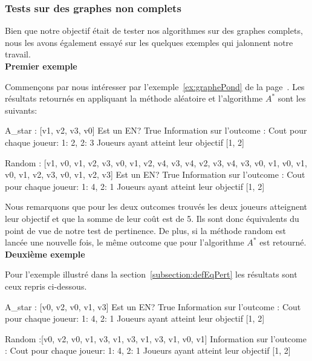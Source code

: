 \FloatBarrier

\subsubsection*{Tests sur des graphes non complets}

Bien que notre objectif était de tester nos algorithmes sur des graphes complets, nous les avons également essayé sur les quelques exemples qui jalonnent notre travail. \\

\noindent \textbf{Premier exemple}

Commençons par nous intéresser par l'exemple~\ref{ex:graphePond} de la page~\pageref{ex:graphePond}. Les résultats retournés en appliquant la méthode aléatoire et l'algorithme $A^*$ sont les suivants:

\begin{code}

A_star : [v1, v2, v3, v0]
Est un EN?  True
Information sur l'outcome : 
Cout pour chaque joueur:  {1: 2, 2: 3}
Joueurs ayant atteint leur objectif  [1, 2]

Random :  [v1, v0, v1, v2, v3, v0, v1, v2,
v4, v3, v4, v2, v3, v4, v3, v0, v1, v0, v1,
v0, v1, v2, v3, v0, v1, v2, v3]
Est un EN?  True
Information sur l'outcome :
Cout pour chaque joueur:  {1: 4, 2: 1}
Joueurs ayant atteint leur objectif  [1, 2]

\end{code}


Nous remarquons que pour les deux outcomes trouvés les deux joueurs atteignent leur objectif et que la somme de leur coût est de 5. Ils sont donc équivalents du point de vue de notre test de pertinence. De plus, si la méthode random est lancée une nouvelle fois, le même outcome que pour l'algorithme $A^*$ est retourné. \\

\noindent \textbf{Deuxième exemple}

Pour l'exemple illustré dans la section~\ref{subsection:defEqPert} les résultats sont ceux repris ci-dessous.
\begin{code}
A_star : [v0, v2, v0, v1, v3]
Est un EN?  True
Information sur l'outcome : 
Cout pour chaque joueur:  {1: 4, 2: 1}
Joueurs ayant atteint leur objectif  [1, 2]

Random :[v0, v2, v0, v1, v3, v1, v3,
v1, v3, v1, v0, v1]
Information sur l'outcome :
Cout pour chaque joueur:  {1: 4, 2: 1}
Joueurs ayant atteint leur objectif  [1, 2]

\end{code}


